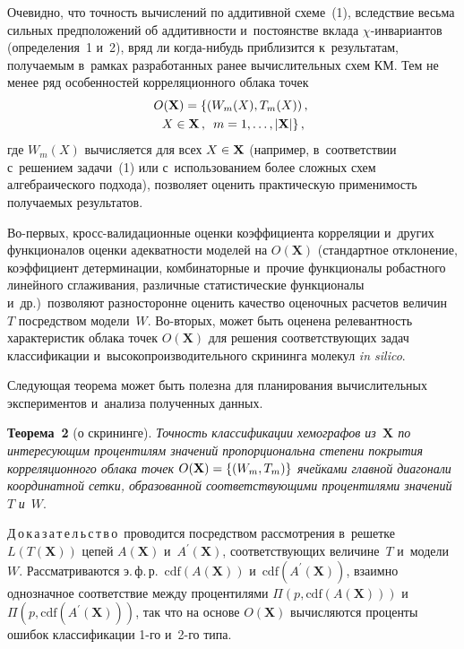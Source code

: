 \begin{multicols}{2}
    Очевидно, что точность вычислений по аддитивной схеме~(1), вследствие 
весьма сильных предположений об аддитивности и~постоянстве вклада  
$\chi$-ин\-ва\-ри\-ан\-тов (определения~1 и~2), вряд ли когда-нибудь приблизится к~результатам, по\-лу\-ча\-емым 
в~рамках разработанных ранее вы\-чис\-ли\-тель\-ных 
схем КМ. Тем не менее ряд особенностей корреляционного облака точек 
\begin{multline*}
{O}(\mathbf{X})= \left\{\left({W}_m({X}), 
{T}_m({X})\right),\right.\\
\left. {X}\in \mathbf{X}\,,\enskip m\hm= 1, \ldots , \vert 
\mathbf{X}\vert\right\},
\end{multline*}
 где ${W}_m({X})$ вычисляется для всех 
${X}\hm\in\mathbf{X}$ (например, в~соответствии с~решением 
задачи~(1) или с~использованием более сложных схем алгебраического 
подхода), позволяет оценить практическую применимость получаемых 
результатов. 
     
     Во-первых, кросс-ва\-ли\-да\-ци\-он\-ные оценки коэффициента 
корреляции и~других функционалов оценки адекватности моделей на 
${O}(\mathbf{X})$ (стандартное отклонение, коэффициент 
детерминации, комбинаторные и~прочие функционалы робастного линейного 
сглаживания, различные статистические функционалы и~др.)\ позволяют 
разносторонне оценить качество оценочных расчетов величин~$T$ посредством 
модели~$W$. Во-вто\-рых, может быть оценена релевантность характеристик 
облака точек ${O}(\mathbf{X})$ для решения соответствующих задач 
классификации и~высокопроизводительного скрининга молекул \textit{in silico}. 

Сле\-ду\-ющая тео\-ре\-ма может быть полезна для планирования 
вычислительных экспериментов и~анализа полученных данных.

\smallskip

\noindent
\textbf{Теорема~2} (о скрининге). \textit{Точность классификации хемографов 
из~$\mathbf{X}$   по интересующим процентилям значений пропорциональна степени 
покрытия корреляционного облака точек ${O}(\mathbf{X}) \hm= \{ 
({W}_m, {T}_m)\}$ ячейками главной диагонали координатной 
сетки, образованной соответствующими процентилями значений}~$T$ \textit{и}~$W$. 

\smallskip
    
\noindent
Д\,о\,к\,а\,з\,а\,т\,е\,л\,ь\,с\,т\,в\,о\ проводится посредством рассмотрения в~решетке 
${L}({T}(\mathbf{X}))$ цепей ${A}(\mathbf{X})$ 
и~${A}^\prime(\mathbf{X})$, соответствующих величине~$T$ 
и~модели~$W$. Рас\-смат\-ри\-ва\-ют\-ся э.\,ф.\,р.\ 
$\mathrm{cdf}({A}(\mathbf{X}))$ 
и~$\mathrm{cdf}({A}^\prime(\mathbf{X}))$, взаимно однозначное 
соответствие между процентилями 
$\Pi(p,\mathrm{cdf}({A}(\mathbf{X})))$ 
и~$\Pi(p,\mathrm{cdf}({A}^\prime(\mathbf{X})))$, так что на основе 
${O}(\mathbf{X})$ вычисляются проценты ошибок классификации 1-го 
и~2-го типа. 


\end{multicols}
